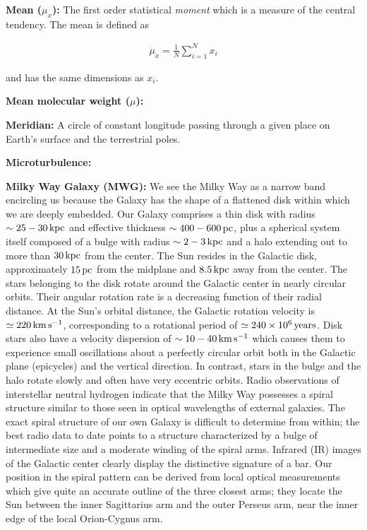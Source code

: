 \documentclass[a4paper,10pt]{article}
\begin{document}
{\noindent}\textbf{Mean ($\mu_x$):} The first order statistical \textit{moment} which is a measure of the central tendency. The mean is defined as

\begin{align*}
    \mu_x = \frac{1}{N} \sum_{i=1}^N x_i
\end{align*}

{\noindent}and has the same dimensions as $x_i$.

{\noindent}\textbf{Mean molecular weight ($\mu$):}

{\noindent}\textbf{Meridian:} A circle of constant longitude passing through a given place on Earth's surface and the terrestrial poles.

{\noindent}\textbf{Microturbulence:}

{\noindent}\textbf{Milky Way Galaxy (MWG):} We see the Milky Way as a narrow band encircling us because the Galaxy has the shape of a flattened disk within which we are deeply embedded. Our Galaxy comprises a thin disk with radius $\sim25-30\,{\rm kpc}$ and effective thickness $\sim400-600\,{\rm pc}$, plus a spherical system itself composed of a bulge with radius $\sim2-3\,{\rm kpc}$ and a halo extending out to more than $30\,{\rm kpc}$ from the center. The Sun resides in the Galactic disk, approximately $15\,{\rm pc}$ from the midplane and $8.5\,{\rm kpc}$ away from the center. The stars belonging to the disk rotate around the Galactic center in nearly circular orbits. Their angular rotation rate is a decreasing function of their radial distance. At the Sun's orbital distance, the Galactic rotation velocity is $\simeq220\,{\rm km\,s^{-1}}$, corresponding to a rotational period of $\simeq240\times10^6\,{\rm years}$. Disk stars also have a velocity dispersion of $\sim10-40\,{\rm km\,s^{-1}}$ which causes them to experience small oscillations about a perfectly circular orbit both in the Galactic plane (epicycles) and the vertical direction. In contrast, stars in the bulge and the halo rotate slowly and often have very eccentric orbits. Radio observations of interstellar neutral hydrogen indicate that the Milky Way possesses a spiral structure similar to those seen in optical wavelengths of external galaxies. The exact spiral structure of our own Galaxy is difficult to determine from within; the best radio data to date points to a structure characterized by a bulge of intermediate size and a moderate winding of the spiral arms. Infrared (IR) images of the Galactic center clearly display the distinctive signature of a bar. Our position in the spiral pattern can be derived from local optical measurements which give quite an accurate outline of the three closest arms; they locate the Sun between the inner Sagittarius arm and the outer Perseus arm, near the inner edge of the local Orion-Cygnus arm.
\end{document}
